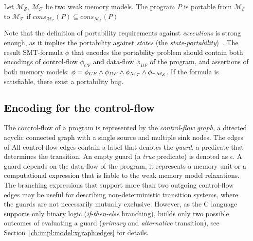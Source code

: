 \begin{definition}[Portability]
Let $\mathcal{M_S}$, $\mathcal{M_T}$ be two weak memory models.
The program $P$ is portable from $\mathcal{M_S}$ to $\mathcal{M_T}$ if 
$\textit{cons}_{\mathcal{M_T}}(P) \subseteq \textit{cons}_{\mathcal{M_S}}(P)$
\end{definition}

Note that the definition of portability requirements against \textit{executions} is strong enough, as it implies the portability against \textit{states} (the \textit{state-portability})~\cite{Porthos17b}.
The result SMT-formula $\phi$ that encodes the portability problem should contain both encodings of control-flow $\phi_{CF}$ and data-flow $\phi_{DF}$ of the program, and assertions of both memory models: ${\phi = \phi_{CF} \land \phi_{DF} \land \phi_{\mathcal{M_T}} \land \phi_{\lnot\mathcal{M_S}}}$.
If the formula is satisfiable, there exist a portability bug.


\subsection{Encoding for the control-flow} %
\label{ch:enc:bmc:cf}

The control-flow of a program is represented by the \textit{control-flow graph}, a directed acyclic connected graph with a single source and multiple sink nodes. %
The edges of 
All control-flow edges contain a label that denotes the \textit{guard}, a predicate that determines the transition.
An empty guard (a \textit{true} predicate) is denoted as $\epsilon$.
A guard depends on the data-flow of the program, it represents a memory unit or a computational expression that is liable to the weak memory model relaxations.
The branching expressions that support more than two outgoing control-flow edges may be useful for describing non-deterministic transition systems, where the guards are not necessarily mutually exclusive.
However, as the C language supports only binary logic (\textit{if-then-else} branching), \porthos[2] builds only two possible outcomes of evaluating a guard (\textit{primary} and \textit{alternative} transition), see Section~\ref{ch:impl:model:xgraph:edges} for details.

